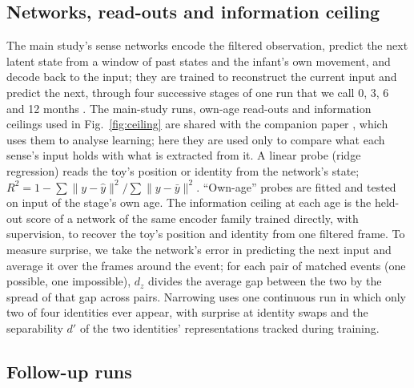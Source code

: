 \documentclass{article}
\begin{document}
\subsection{Networks, read-outs and information ceiling}

The main study's sense networks encode the filtered observation, predict the next latent state from a window of past states and the infant's own movement, and decode back to the input; they are trained to reconstruct the current input and predict the next, through four successive stages of one run that we call 0, 3, 6 and 12 months \autocite{mohapatra2026learn}. The main-study runs, own-age read-outs and information ceilings used in Fig.~\ref{fig:ceiling} are shared with the companion paper \autocite{mohapatra2026learn}, which uses them to analyse learning; here they are used only to compare what each sense's input holds with what is extracted from it. A linear probe (ridge regression) reads the toy's position or identity from the network's state; $R^2 = 1 - \sum\lVert y-\hat y\rVert^2/\sum\lVert y - \bar y\rVert^2$. ``Own-age'' probes are fitted and tested on input of the stage's own age. The information ceiling at each age is the held-out score of a network of the same encoder family trained directly, with supervision, to recover the toy's position and identity from one filtered frame. To measure surprise, we take the network's error in predicting the next input and average it over the frames around the event; for each pair of matched events (one possible, one impossible), $d_z$ divides the average gap between the two by the spread of that gap across pairs. Narrowing uses one continuous run in which only two of four identities ever appear, with surprise at identity swaps and the separability $d'$ of the two identities' representations tracked during training.

\subsection{Follow-up runs}
\end{document}
